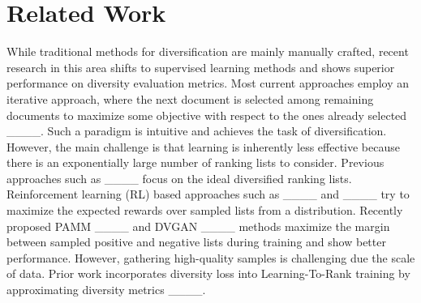 \section{Related Work}
\vspace{-0.10in}
While traditional methods for diversification are mainly manually crafted, recent research in this area shifts to supervised learning methods and shows superior performance on diversity evaluation metrics. Most current approaches employ an iterative approach, where the next document is selected among remaining documents to maximize some objective with respect to the ones already selected ____. Such a paradigm is intuitive and achieves the task of diversification. However, the main challenge is that learning is inherently less effective because there is an exponentially large number of ranking lists to consider.
Previous approaches such as ____ focus on the ideal diversified ranking lists. Reinforcement learning (RL) based approaches such as ____ and ____ try to maximize the expected rewards over sampled lists from a distribution. Recently proposed PAMM ____ and DVGAN ____ methods maximize the margin between sampled positive and negative lists during training and show better performance. However, gathering high-quality samples is challenging due the scale of data. Prior work incorporates diversity loss into Learning-To-Rank training by approximating diversity metrics ____.